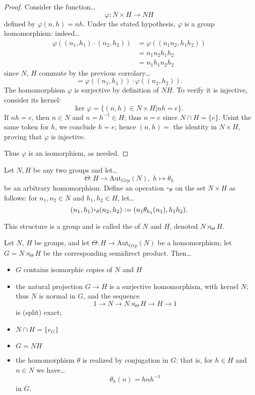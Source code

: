 \begin{proof}
Consider the function\dots
$$\varphi : N \times H \rightarrow NH$$
defined by $\varphi(n,h) = nh$. Under the stated hypothesis, $\varphi$ is a group homomorphism: indeed\dots
\begin{align*}
	\varphi((n_1,h_1) \cdot (n_2, h_2)) &= \varphi((n_1n_2,h_1h_2)) \\
										&= n_1n_2h_1h_2 \\
										&= n_1h_1n_2h_2
\end{align*}
since $N$, $H$ commute by the previous corrolary\dots
$$=\varphi((n_1,h_1)) \cdot \varphi((n_2,h_2)).$$
The homomorphism $\varphi$ is surjective by definition of $NH$. To verify it is injective, consider its kernel:
$$\textrm{ker } \varphi = \{(n,h) \in N \times H | nh = e \}.$$
If $nh = e$, then $n \in N$ and $n = h^{-1} \in H$; thus $n = e$ since $N \cap H = \{ e \}$. Usint the same token
for $h$, we conclude $h = e$; hence $(n,h) =$ the identity in $N \times H$, proving that $\varphi$ is injective.

Thus $\varphi$ is an isomorphism, as needed.
\end{proof}

Let $N, H$ be any two groups and let\dots
$$\Theta : H \rightarrow \textrm{Aut}_{Grp}(N), \; h \mapsto \theta_h$$
be an arbitrary homomorphism. Define an operation $\LargerCdot_{\theta}$ on the set $N \times H$ as follows: for $n_1, n_2 \in N$ and $h_1,h_2 \in H$, let\dots
$$(n_1,h_1)\LargerCdot_{\theta}(n_2,h_2) := (n_1\theta_{h_1}(n_1),h_1h_2).$$\newline

\noindent This structure is a group and is called the \label{semidirect product} of $N$ and $H$, denoted $N \rtimes_{\Theta} H$.

\begin{proposition}
Let $N$, $H$ be groups, and let $\Theta : H \rightarrow \textrm{Aut}_{Grp}(N)$ be a homomorphism; let $G = N \rtimes_{\Theta} H$ be the corresponding semidirect product. Then\dots
\begin{itemize}
  \item $G$ contains isomorphic copies of $N$ and $H$
  \item the natural projection $G \rightarrow H$ is a surjective homomorphism, with kernel $N$; thus $N$ is normal in $G$, and the sequence
  $$1 \rightarrow N \rightarrow N \rtimes_{\Theta} H \rightarrow H \rightarrow 1$$
  is (split) exact;
  \item $N \cap H = \{ e_G \}$
  \item $G = NH$
  \item the homomorphism $\theta$ is realized by conjugation in $G$: that is, for $h \in H$ and $n \in N$ we have\dots
  $$\theta_h(n) = hnh^{-1}$$
  in $G$.
\end{itemize}
\end{proposition}

